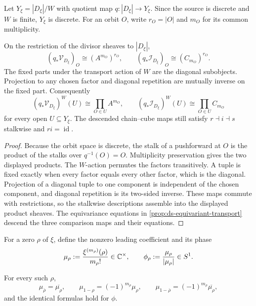 Let $Y_\xi=|D_\xi|/W$ with quotient map $q:|D_\xi|\to Y_\xi$.  Since the source
is discrete and $W$ is finite, $Y_\xi$ is discrete.  For an orbit $O$, write
$r_O=|O|$ and $m_O$ for its common multiplicity.

\begin{theorem}
\label{thm:ds-packet-descent}
On the restriction of the divisor sheaves to $|D_\xi|$,
\[
 (q_*\mathcal V_{D_\xi})_O\cong(A^{m_O})^{r_O},
 \qquad
 (q_*\mathcal I_{D_\xi})_O\cong(C_{m_O})^{r_O}.
\]
The fixed parts under the transport action of $W$ are the diagonal subobjects.
Projection to any chosen factor and diagonal repetition are mutually inverse on
the fixed part.  Consequently
\[
 (q_*\mathcal V_{D_\xi})^W(U)
 \cong\prod_{O\in U}A^{m_O},
 \qquad
 (q_*\mathcal I_{D_\xi})^W(U)
 \cong\prod_{O\in U}C_{m_O}
\]
for every open $U\subseteq Y_\xi$.
The descended chain--cube maps still satisfy
$r\dashv i\dashv s$ stalkwise and $ri=\operatorname{id}$.
\end{theorem}

\begin{proof}
Because the orbit space is discrete, the stalk of a pushforward at $O$ is the
product of the stalks over $q^{-1}(O)=O$.  Multiplicity preservation gives the
two displayed products.  The $W$-action permutes the factors transitively.
A tuple is fixed exactly when every factor equals every other factor, which is
the diagonal.  Projection of a diagonal tuple to one component is independent of
the chosen component, and diagonal repetition is its two-sided inverse.  These
maps commute with restrictions, so the stalkwise descriptions assemble into the
displayed product sheaves.  The equivariance equations in
\cref{prop:ds-equivariant-transport} descend the three comparison maps and their
equations.
\end{proof}

For a zero $\rho$ of $\xi$, define the nonzero leading coefficient and its phase
\[
 \mu_\rho:=\frac{\xi^{(m_\rho)}(\rho)}{m_\rho!}\in\mathbb C^\times,
 \qquad
 \phi_\rho:=\frac{\mu_\rho}{|\mu_\rho|}\in S^1.
\]

\begin{proposition}
\label{prop:ds-phase-transport}
For every such $\rho$,
\[
 \mu_{\overline\rho}=\overline{\mu_\rho},
 \qquad
 \mu_{1-\rho}=(-1)^{m_\rho}\mu_\rho,
 \qquad
 \mu_{1-\overline\rho}=(-1)^{m_\rho}\overline{\mu_\rho},
\]
and the identical formulas hold for $\phi$.
\end{proposition}

